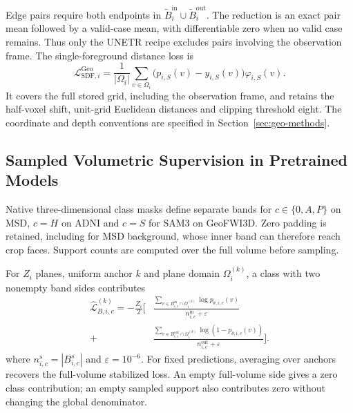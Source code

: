 \documentclass[12pt,a4paper]{article}
\begin{document}
Edge pairs require both endpoints in
$\widetilde B_i^{\mathrm{in}}\cup\widetilde B_i^{\mathrm{out}}$.
The reduction is an exact pair mean followed by a valid-case mean,
with differentiable zero when no valid case remains. Thus only the
UNETR recipe excludes pairs involving the observation frame.
The single-foreground distance loss is
\begin{equation}
\mathcal{L}_{\mathrm{SDF},i}^{\mathrm{Geo}}
=\frac{1}{|\Omega_i|}\sum_{v\in\Omega_i}
 \bigl(p_{i,S}(v)-y_{i,S}(v)\bigr)\varphi_{i,S}(v).
\label{eq:geological-sdf-loss}
\end{equation}
It covers the full stored grid, including the observation frame,
and retains the half-voxel shift, unit-grid Euclidean distances and
clipping threshold eight. The coordinate and depth conventions are
specified in Section~\ref{sec:geo-methods}.

\subsection{Sampled Volumetric Supervision in Pretrained Models}
\label{sec:sampled-pretrained-supervision}

Native three-dimensional class masks define separate bands for
$c\in\{0,A,P\}$ on MSD, $c=H$ on ADNI and $c=S$ for SAM3 on
GeoFWI3D. Zero padding is retained, including for MSD background,
whose inner band can therefore reach crop faces. Support counts are
computed over the full volume before sampling.

For $Z_i$ planes, uniform anchor $k$ and plane domain
$\Omega_i^{(k)}$, a class with two nonempty band sides contributes
\begin{equation}
\begin{aligned}
\widehat{\mathcal{L}}_{B,i,c}^{(k)}
=-\frac{Z_i}{2}\Biggl[
 &\frac{\sum_{v\in B_{i,c}^{\mathrm{in}}\cap\Omega_i^{(k)}}
                  \log p_{\theta,i,c}(v)}
        {n_{i,c}^{\mathrm{in}}+\varepsilon}\\
 {}+{}&\frac{\sum_{v\in B_{i,c}^{\mathrm{out}}\cap\Omega_i^{(k)}}
                  \log(1-p_{\theta,i,c}(v))}
        {n_{i,c}^{\mathrm{out}}+\varepsilon}\Biggr].
\end{aligned}
\label{eq:medsam-sampled-band-loss}
\end{equation}
where $n_{i,c}^s=|B_{i,c}^s|$ and $\varepsilon=10^{-6}$.
For fixed predictions, averaging over anchors recovers the full-volume
stabilized loss. An empty full-volume side gives a zero class contribution;
an empty sampled support also contributes zero without changing the
global denominator.
\end{document}
